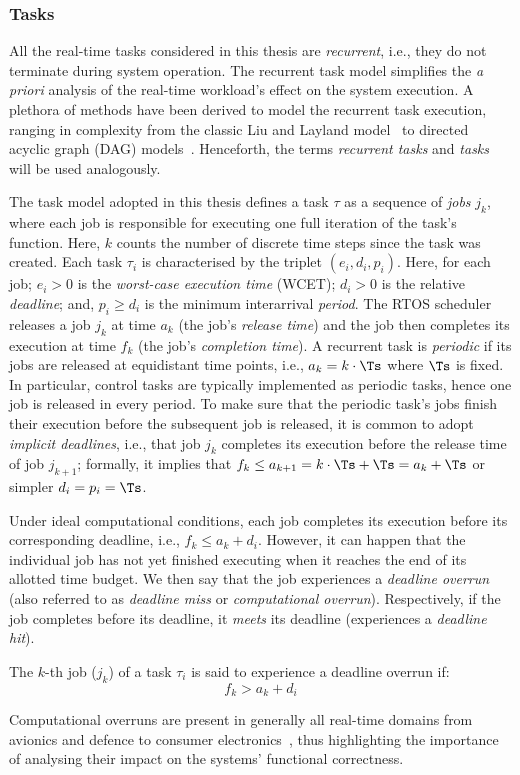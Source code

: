 \subsubsection*{Tasks}%
All the real-time tasks considered in this thesis are \emph{recurrent}, i.e., they do not terminate during system operation.
The recurrent task model simplifies the \emph{a priori} analysis of the real-time workload's effect on the system execution.
A plethora of methods have been derived to model the recurrent task execution, ranging in complexity from the classic Liu and Layland model~\cite{Liu:1973} to directed acyclic graph (DAG) models~\cite{Saifullah:2014}.
Henceforth, the terms \emph{recurrent tasks} and \emph{tasks} will be used analogously.

The task model adopted in this thesis defines a task $\tau$ as a sequence of \emph{jobs} $j_k$, where each job is responsible for executing one full iteration of the task's function.
Here, $k$ counts the number of discrete time steps since the task was created.
Each task $\tau_i$ is characterised by the triplet $(e_i, d_i, p_i)$.
Here, for each job; $e_i > 0$ is the \emph{worst-case execution time} (WCET); $d_i > 0$ is the relative \emph{deadline}; and, $p_i \geq d_i$ is the minimum interarrival \emph{period}.
The RTOS scheduler releases a job $j_k$ at time $a_k$ (the job's \emph{release time}) and the job then completes its execution at time $f_k$ (the job's \emph{completion time}).
A recurrent task is \emph{periodic} if its jobs are released at equidistant time points, i.e., $a_k = k\cdot \Ts$ where $\Ts$ is fixed. 
In particular, control tasks are typically implemented as periodic tasks, hence one job is released in every period.
To make sure that the periodic task's jobs finish their execution before the subsequent job is released, it is common to adopt \emph{implicit deadlines}, i.e., that job $j_k$ completes its execution before the release time of job $j_{k+1}$; formally, it implies that $f_k \leq a_{k+1} = k\cdot \Ts+\Ts = a_k + \Ts$ or simpler $d_i = p_i = \Ts$.

Under ideal computational conditions, each job completes its execution before its corresponding deadline, i.e., $f_k \leq a_k + d_i$.
However, it can happen that the individual job has not yet finished executing when it reaches the end of its allotted time budget.
We then say that the job experiences a \emph{deadline overrun} (also referred to as \emph{deadline miss} or \emph{computational overrun}).
Respectively, if the job completes before its deadline, it \emph{meets} its deadline (experiences a \emph{deadline hit}).
%
\begin{definition}%
    \label{def:kappa:overrun}%
    The $k$-th job ($j_k$) of a task $\tau_i$ is said to experience a deadline overrun if:
    \begin{equation*}
        f_k > a_k + d_i
    \end{equation*}
\end{definition}
%
Computational overruns are present in generally all real-time domains from avionics and defence to consumer electronics~\cite{Akesson:2020}, thus highlighting the importance of analysing their impact on the systems' functional correctness.

